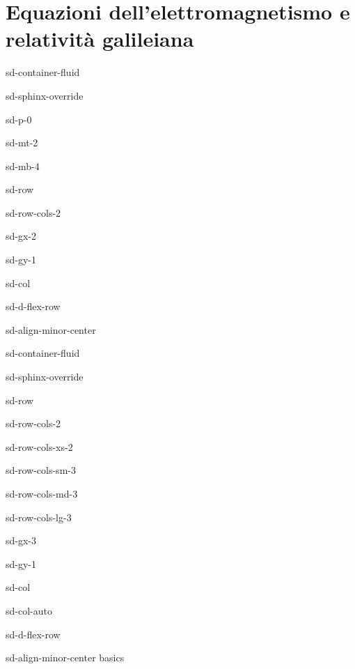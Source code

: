 \documentclass[letterpaper,10pt,english]{jupyterBook}
\begin{document}
\chapter{Equazioni dell’elettromagnetismo e relatività galileiana}
\label{\detokenize{ch/low-speed-relativity:equazioni-dell-elettromagnetismo-e-relativita-galileiana}}\label{\detokenize{ch/low-speed-relativity:classical-electromagnetism-low-speed-relativity}}\label{\detokenize{ch/low-speed-relativity::doc}}
\sphinxstepscope

\begin{sphinxuseclass}{sd-container-fluid}
\begin{sphinxuseclass}{sd-sphinx-override}
\begin{sphinxuseclass}{sd-p-0}
\begin{sphinxuseclass}{sd-mt-2}
\begin{sphinxuseclass}{sd-mb-4}
\begin{sphinxuseclass}{sd-row}
\begin{sphinxuseclass}{sd-row-cols-2}
\begin{sphinxuseclass}{sd-gx-2}
\begin{sphinxuseclass}{sd-gy-1}
\begin{sphinxuseclass}{sd-col}
\begin{sphinxuseclass}{sd-d-flex-row}
\begin{sphinxuseclass}{sd-align-minor-center}
\begin{sphinxuseclass}{sd-container-fluid}
\begin{sphinxuseclass}{sd-sphinx-override}
\begin{sphinxuseclass}{sd-row}
\begin{sphinxuseclass}{sd-row-cols-2}
\begin{sphinxuseclass}{sd-row-cols-xs-2}
\begin{sphinxuseclass}{sd-row-cols-sm-3}
\begin{sphinxuseclass}{sd-row-cols-md-3}
\begin{sphinxuseclass}{sd-row-cols-lg-3}
\begin{sphinxuseclass}{sd-gx-3}
\begin{sphinxuseclass}{sd-gy-1}
\begin{sphinxuseclass}{sd-col}
\begin{sphinxuseclass}{sd-col-auto}
\begin{sphinxuseclass}{sd-d-flex-row}
\begin{sphinxuseclass}{sd-align-minor-center}
\sphinxAtStartPar
basics


\end{sphinxuseclass}
\end{sphinxuseclass}
\end{sphinxuseclass}
\end{sphinxuseclass}
\end{sphinxuseclass}
\end{sphinxuseclass}
\end{sphinxuseclass}
\end{sphinxuseclass}
\end{sphinxuseclass}
\end{sphinxuseclass}
\end{sphinxuseclass}
\end{sphinxuseclass}
\end{sphinxuseclass}
\end{sphinxuseclass}
\end{sphinxuseclass}
\end{sphinxuseclass}
\end{sphinxuseclass}
\end{sphinxuseclass}
\end{sphinxuseclass}
\end{sphinxuseclass}
\end{sphinxuseclass}
\end{sphinxuseclass}
\end{sphinxuseclass}
\end{sphinxuseclass}
\end{sphinxuseclass}
\end{sphinxuseclass}
\end{document}
